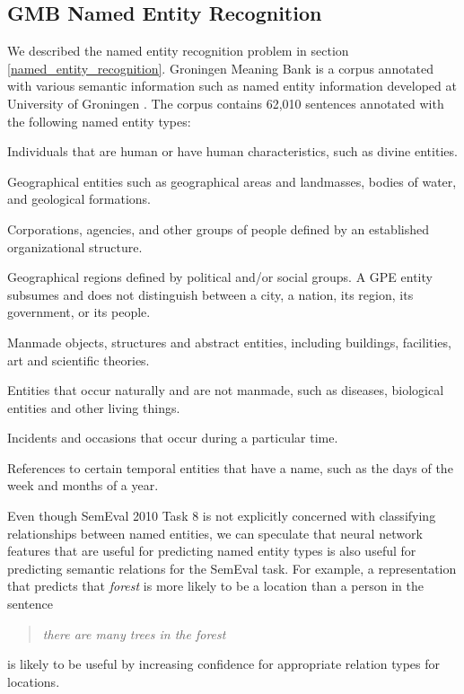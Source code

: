\subsection{GMB Named Entity Recognition}
We described the named entity recognition problem in section \ref{named_entity_recognition}. Groningen Meaning Bank is a corpus annotated with various semantic information such as named entity information developed at University of Groningen \citep{basile2012}. The corpus contains 62,010 sentences annotated with the following named entity types:

\begin{description}[labelindent=4em, leftmargin=4em]
	\item [Person] Individuals that are human or have human characteristics, such as divine entities.
	\item [Location]  Geographical entities such as geographical areas and landmasses, bodies of water, and geological formations.
	\item [Organization] Corporations, agencies, and other groups of people defined by an established organizational structure.
	\item [Geo-Political Entity] Geographical regions defined by political and/or social groups. A GPE entity subsumes and does not distinguish between a city, a nation, its region, its government, or its people.
	\item [Artifact] Manmade objects, structures and abstract entities, including buildings, facilities, art and scientific theories.
	\item [Natural Object] Entities that occur naturally and are not manmade, such as diseases, biological entities and other living things.
	\item [Event] Incidents and occasions that occur during a particular time.
	\item [Time] References to certain temporal entities that have a name, such as the days of the week and months of a year.
\end{description}
\noindent
Even though SemEval 2010 Task 8 is not explicitly concerned with classifying relationships between named entities, we can speculate that neural network features that are useful for predicting named entity types is also useful for predicting semantic relations for the SemEval task. For example, a representation that predicts that \textit{forest} is more likely to be a location than a person in the sentence
\begin{quote}
\textit{there are many trees in the forest}	
\end{quote}
is likely to be useful by increasing confidence for appropriate relation types for locations.